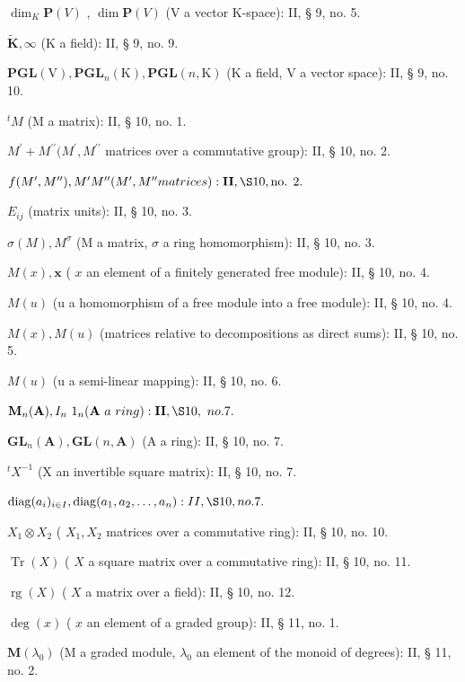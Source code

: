 \(\dim_{K} \mathbf{P}(V)\) , \(\dim \mathbf{P}(V)\) (V a vector K-space): II, § 9, no. 5.

\(\tilde{\mathbf{K}}, \infty\) (K a field): II, § 9, no. 9.

\(\mathbf{PGL}(\mathrm{V}), \mathbf{PGL}_n(\mathrm{K}), \mathbf{PGL}(n, \mathrm{K})\) (K a field, V a vector space): II, § 9, no. 10.

\(^{t}M\) (M a matrix): II, § 10, no. 1.

\(M^{\prime} + M^{\prime \prime}(M^{\prime},M^{\prime \prime}\) matrices over a commutative group): II, § 10, no. 2.

\(f(M', M''), M'M'' (M', M'' matrices): \mathbf{II}, \S 10, \text{no. } 2.\)

\(E_{ij}\) (matrix units): II, § 10, no. 3.

\(\sigma(M), M^{\sigma}\) (M a matrix, \(\sigma\) a ring homomorphism): II, § 10, no. 3.

\(M(x), \mathbf{x}\) ( \(x\) an element of a finitely generated free module): II, § 10, no. 4.

\(M(u)\) (u a homomorphism of a free module into a free module): II, § 10, no. 4.

\(M(x), M(u)\) (matrices relative to decompositions as direct sums): II, § 10, no. 5.

\(M(u)\) (u a semi-linear mapping): II, § 10, no. 6.

\(\mathbf{M}_{n}(\mathbf{A}), I_{n} \ 1_{n} (\mathbf{A} \ a \ ring): \mathbf{II}, \S 10, \ no. 7.\)

\(\mathbf{GL}_n(\mathbf{A}), \mathbf{GL}(n, \mathbf{A})\) (A a ring): II, § 10, no. 7.

\(^{t}X^{-1}\) (X an invertible square matrix): II, § 10, no. 7.

\(\operatorname{diag}(a_{i})_{i \in I}, \operatorname{diag}(a_{1}, a_{2}, \ldots, a_{n}) : II, \S 10, no. 7.\)

\(X_{1} \otimes X_{2}\) ( \(X_{1}, X_{2}\) matrices over a commutative ring): II, § 10, no. 10.

\(\operatorname{Tr}(X)\) ( \(X\) a square matrix over a commutative ring): II, § 10, no. 11.

\(\operatorname{rg}(X)\) ( \(X\) a matrix over a field): II, § 10, no. 12.

\(\deg (x)\) ( \(x\) an element of a graded group): II, § 11, no. 1.

\(\mathbf{M}(\lambda_{0})\) (M a graded module, \(\lambda_{0}\) an element of the monoid of degrees): II, § 11, no. 2.

